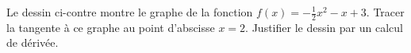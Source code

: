 
\begin{exercice}\label{exosmath-0405}


\begin{minipage}{0.485\textwidth}
    Le dessin ci-contre montre le graphe de la fonction \( f(x)=-\frac{ 1 }{ 2 }x^2-x+3\). Tracer la tangente à ce graphe au point d'abscisse \( x=2\).  Justifier le dessin par un calcul de dérivée.
                    \end{minipage}
                    \hspace{1mm}    
                    \begin{minipage}{0.485\textwidth}
                            \begin{center}
                            
                            \end{center}
                    \end{minipage}

\end{exercice}
